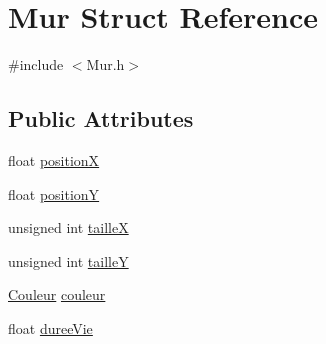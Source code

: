 \hypertarget{structMur}{\section{Mur Struct Reference}
\label{structMur}
}


{\ttfamily \#include $<$Mur.\-h$>$}

\subsection*{Public Attributes}
\begin{DoxyCompactItemize}
\item 
float \hyperlink{structMur_affc832d25c091c05a2ab0340a38e8617}{position\-X}
\item 
float \hyperlink{structMur_a5cb3e3d2e2f71120f6746772a44a0980}{position\-Y}
\item 
unsigned int \hyperlink{structMur_a83d5a0639f49e58cfb805a91702d6701}{taille\-X}
\item 
unsigned int \hyperlink{structMur_ad0c6b841ae4069d6b4e6559d7e88cf47}{taille\-Y}
\item 
\hyperlink{Couleur_8h_aa304d0ca681f782b1d7735da33037dd7}{Couleur} \hyperlink{structMur_adfb47de65971e21c8b3012cfcf7cab28}{couleur}
\item 
float \hyperlink{structMur_a7b0f44b48d4a8408e1adeb057ad201f8}{duree\-Vie}
\end{DoxyCompactItemize}


